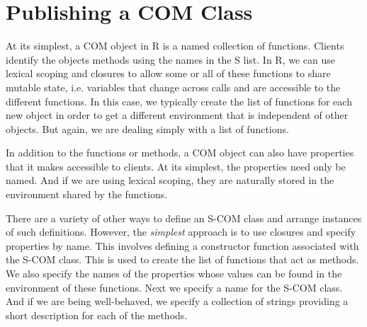 \documentclass[11pt]{article}
\begin{document}
\section{Publishing a COM Class}
At its simplest, a COM object in R is a named collection of functions.
Clients identify the objects methods using the names in the S list. In
R, we can use lexical scoping and closures to allow some or all of
these functions to share mutable state, i.e. variables that change
across calls and are accessible to the different functions.  In this
case, we typically create the list of functions for each new object in
order to get a different environment that is independent of other
objects. But again, we are dealing simply with a list of functions.

In addition to the functions or methods, a COM object can also have
properties that it makes accessible to clients.  At its simplest, the
properties need only be named.  And if we are using lexical scoping,
they are naturally stored in the environment shared by the functions.

There are a variety of other ways to define an S-COM class and arrange
instances of such definitions. However, the \textit{simplest} approach
is to use closures and specify properties by name.  This involves
defining a constructor function associated with the S-COM class.  This
is used to create the list of functions that act as methods.  We also
specify the names of the properties whose values can be found in the
environment of these functions.  Next we specify a name for the S-COM
class. And if we are being well-behaved, we specify a collection of
strings providing a short description for each of the methods.
\end{document}
